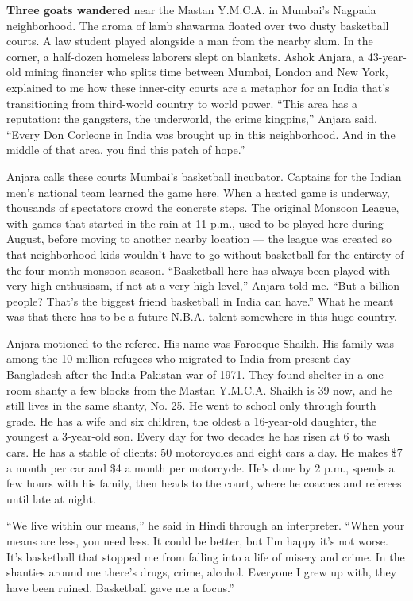 \textbf{Three goats wandered} near the Mastan Y.M.C.A. in Mumbai's
Nagpada neighborhood. The aroma of lamb shawarma floated over two dusty
basketball courts. A law student played alongside a man from the nearby
slum. In the corner, a half-dozen homeless laborers slept on blankets.
Ashok Anjara, a 43-year-old mining financier who splits time between
Mumbai, London and New York, explained to me how these inner-city courts
are a metaphor for an India that's transitioning from third-world
country to world power. ``This area has a reputation: the gangsters, the
underworld, the crime kingpins,'' Anjara said. ``Every Don Corleone in
India was brought up in this neighborhood. And in the middle of that
area, you find this patch of hope.''

Anjara calls these courts Mumbai's basketball incubator. Captains for
the Indian men's national team learned the game here. When a heated game
is underway, thousands of spectators crowd the concrete steps. The
original Monsoon League, with games that started in the rain at 11 p.m.,
used to be played here during August, before moving to another nearby
location --- the league was created so that neighborhood kids wouldn't
have to go without basketball for the entirety of the four-month monsoon
season. ``Basketball here has always been played with very high
enthusiasm, if not at a very high level,'' Anjara told me. ``But a
billion people? That's the biggest friend basketball in India can
have.'' What he meant was that there has to be a future N.B.A. talent
somewhere in this huge country.

Anjara motioned to the referee. His name was Farooque Shaikh. His family
was among the 10 million refugees who migrated to India from present-day
Bangladesh after the India-Pakistan war of 1971. They found shelter in a
one-room shanty a few blocks from the Mastan Y.M.C.A. Shaikh is 39 now,
and he still lives in the same shanty, No. 25. He went to school only
through fourth grade. He has a wife and six children, the oldest a
16-year-old daughter, the youngest a 3-year-old son. Every day for two
decades he has risen at 6 to wash cars. He has a stable of clients: 50
motorcycles and eight cars a day. He makes \$7 a month per car and \$4 a
month per motorcycle. He's done by 2 p.m., spends a few hours with his
family, then heads to the court, where he coaches and referees until
late at night.

``We live within our means,'' he said in Hindi through an interpreter.
``When your means are less, you need less. It could be better, but I'm
happy it's not worse. It's basketball that stopped me from falling into
a life of misery and crime. In the shanties around me there's drugs,
crime, alcohol. Everyone I grew up with, they have been ruined.
Basketball gave me a focus.''

